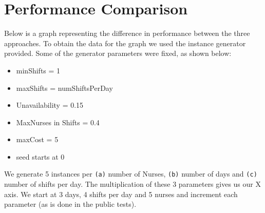 \documentclass[sigconf, 10pt]{acmart}
\begin{document}
\section{Performance Comparison}
Below is a graph representing the difference in performance between the three approaches. To obtain the data for the graph we used the instance generator provided. Some of the generator parameters were fixed, as shown below:
\begin{itemize}
    \item minShifts = 1
    \item maxShifts = numShiftsPerDay
    \item Unavailability = 0.15
    \item MaxNurses in Shifts = 0.4
    \item maxCost = 5
    \item seed starts at 0
\end{itemize}

We generate 5 instances per \verb|(a)| number of Nurses, \verb|(b)| number of days and \verb|(c)| number of shifts per day. The multiplication of these 3 parameters gives us our X axis. We start at 3 days, 4 shifts per day and 5 nurses and increment each parameter (as is done in the public tests). 
\end{document}
